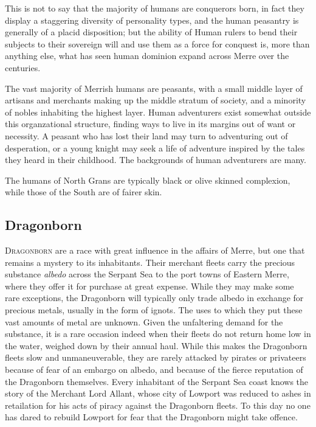 \documentclass[paper=a4, fontsize=11pt]{scrartcl} %
\begin{document}
\begin{multicols}{2}
This is not to say that the majority of humans are conquerors born, in fact they display a staggering diversity of personality types, and the human peasantry is generally of a placid disposition; but the ability of Human rulers to bend their subjects to their sovereign will and use them as a force for conquest is, more than anything else, what has seen human dominion expand across Merre over the centuries.

The vast majority of Merrish humans are peasants, with a small middle layer of artisans and merchants making up the middle stratum of society, and a minority of nobles inhabiting the highest layer. Human adventurers exist somewhat outside this organzational structure, finding ways to live in its margins out of want or necessity. A peasant who has lost their land may turn to adventuring out of desperation, or a young knight may seek a life of adventure inspired by the tales they heard in their childhood. The backgrounds of human adventurers are many.

The humans of North Grans are typically black or olive skinned complexion, while those of the South are of fairer skin.

\subsection{Dragonborn}

\lettrine[lines=2]{\medievalsharp D}{ragonborn} are a race with great influence in the affairs of Merre, but one that remains a mystery to its inhabitants. Their merchant fleets carry the precious substance \textit{albedo} across the Serpant Sea to the port towns of Eastern Merre, where they offer it for purchase at great expense. While they may make some rare exceptions, the Dragonborn will typically only trade albedo in exchange for precious metals, usually in the form of ignots. The uses to which they put these vast amounts of metal are unknown. Given the unfaltering demand for the substance, it is a rare occasion indeed when their fleets do not return home low in the water, weighed down by their annual haul. While this makes the Dragonborn fleets slow and unmaneuverable, they are rarely attacked by pirates or privateers because of fear of an embargo on albedo, and because of the fierce reputation of the Dragonborn themselves. Every inhabitant of the Serpant Sea coast knows the story of the Merchant Lord Allant, whose city of Lowport was reduced to ashes in retailation for his acts of piracy against the Dragonborn fleets. To this day no one has dared to rebuild Lowport for fear that the Dragonborn might take offence.


\end{multicols}
\end{document}
